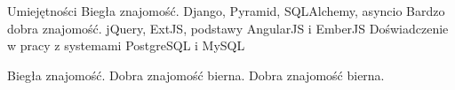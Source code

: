 \begin{rubric}{Umiejętności}
\entry*[Python]
	Biegła znajomość.\newline
    Django, Pyramid, SQLAlchemy, asyncio
\entry*[JavaScript]
	Bardzo dobra znajomość.\newline
    jQuery, ExtJS, podstawy AngularJS i EmberJS
	Doświadczenie w pracy z systemami PostgreSQL i MySQL

\entry*[Angielski]
	Biegła znajomość.
\entry*[Rosyjski]
	Dobra znajomość bierna.
\entry*[Cerkiewnosłowiański]
	Dobra znajomość bierna.
\end{rubric}
